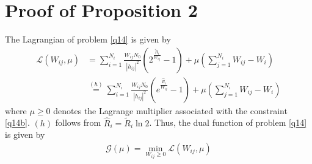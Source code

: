 \documentclass[journal]{IEEEtran}
\begin{document}
\section{Proof of Proposition 2}
The Lagrangian of problem \eqref{q14} is given by
\begin{align}
\mathcal{L}\left(W_{ij}, \mu\right) &=  \sum\limits_{i = 1}^{N_i} \frac{W_{ij}N_0}{\left|h_{ij}\right|^2}\left(2^{\frac{\tilde{R}_i}{W_{ij}}} - 1\right) + \mu\left(\sum_{j = 1}^{N_i}W_{ij} - W_i\right) \nonumber \\ 
& \overset{\left(h\right)}{=} \sum\limits_{i = 1}^{N_i} \frac{W_{ij}N_0}{\left|h_{ij}\right|^2}\left(e^{\frac{\hat{R}_i}{W_{ij}}} - 1\right) + \mu\left(\sum_{j = 1}^{N_i}W_{ij} - W_i\right) 
\end{align}
where $\mu \geq 0$ denotes the Lagrange multiplier associated with the constraint \eqref{q14b}. $\left(h\right)$ follows from $\hat{R}_i = \tilde{R}_i \ln2$. Thus, the dual function of problem \eqref{q14} is given by
\begin{align}
\mathcal{G}\left(\mu\right) = \min_{W_{ij}\geq 0} \mathcal{L}\left(W_{ij},\mu\right)
\end{align}
\end{document}
